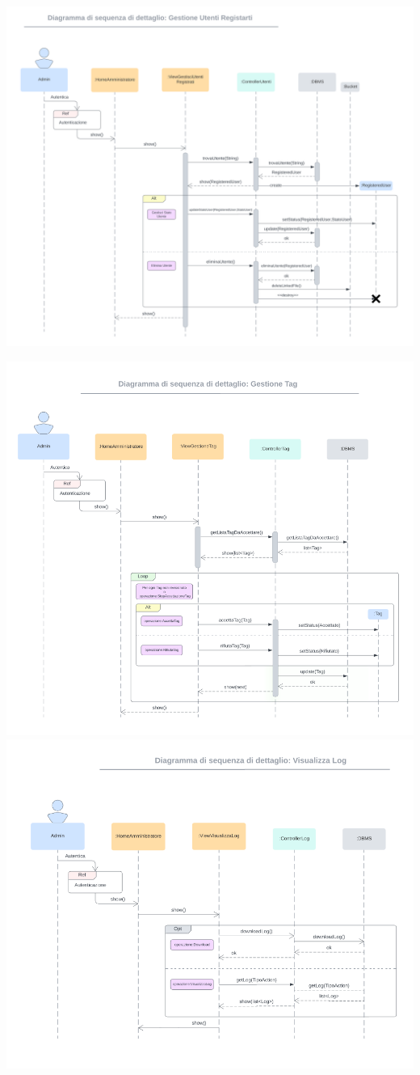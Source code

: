 \includegraphics[width=1\textwidth]{assets/img/sequenza_dettaglio/admin-1.png}\\

\newpage

\includegraphics[width=1\textwidth]{assets/img/sequenza_dettaglio/admin-2.png}\\
\includegraphics[width=1\textwidth]{assets/img/sequenza_dettaglio/admin-3.png}\\